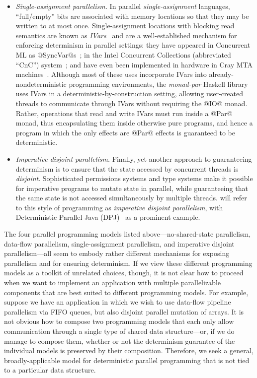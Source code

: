 \begin{itemize}
\item \emph{Single-assignment parallelism.}  In parallel
  \emph{single-assignment} languages, ``full/empty'' bits are
  associated with memory locations so that they may be written to at
  most once. Single-assignment locations with blocking read semantics
  are known as \emph{IVars}~\cite{IStructures} and are a
  well-established mechanism for enforcing determinism in parallel
  settings: they have appeared in Concurrent ML as
  @SyncVar@s~\cite{reppy-cml-book}; in the Intel Concurrent
  Collections (abbreviated ``CnC'') system~\cite{CnC}; and have even
  been implemented in hardware in Cray MTA machines~\cite{cray-mta}.
  Although most of these uses incorporate IVars into
  already-nondeterministic programming environments, the
  \emph{monad-par} Haskell library~\cite{monad-par} uses IVars in a
  deterministic-by-construction setting, allowing user-created threads
  to communicate through IVars without requiring the @IO@ monad.
  Rather, operations that read and write IVars must run inside a @Par@
  monad, thus encapsulating them inside otherwise pure programs, and
  hence a program in which the only effects are @Par@ effects is
  guaranteed to be deterministic.

\item \emph{Imperative disjoint parallelism.}  Finally, yet another
  approach to guaranteeing determinism is to ensure that the state
  accessed by concurrent threads is \emph{disjoint}.  Sophisticated
  permissions systems and type systems make it possible for imperative
  programs to mutate state in parallel, while guaranteeing that the
  same state is not accessed simultaneously by multiple threads.  
  will refer to this style of programming as \emph{imperative disjoint
    parallelism}, with Deterministic Parallel Java
  (DPJ)~\cite{dpj-oopsla, dpj-hotpar09} as a prominent example.
\end{itemize}
The four parallel programming models listed above---no-shared-state
parallelism, data-flow parallelism, single-assignment parallelism, and
imperative disjoint parallelism---all seem to embody rather different
mechanisms for exposing parallelism and for ensuring determinism.  If
we view these different programming models as a toolkit of unrelated
choices, though, it is not clear how to proceed when we want to
implement an application with multiple parallelizable components that
are best suited to different programming models.  For example, suppose
we have an application in which we wish to use data-flow pipeline
parallelism via FIFO queues, but also disjoint parallel mutation of
arrays.  It is not obvious how to compose two programming models that
each only allow communication through a single type of shared data
structure---or, if we do manage to compose them, whether or not the
determinism guarantee of the individual models is preserved by their
composition.  Therefore, we seek a general, broadly-applicable model
for deterministic parallel programming that is not tied to a
particular data structure.

